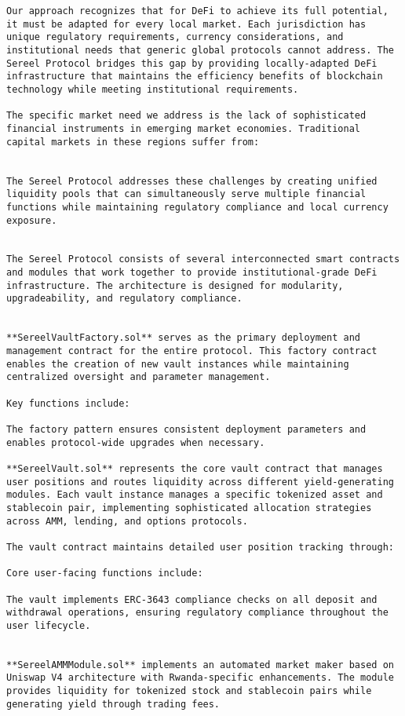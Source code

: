 \documentclass[12pt]{article}
\begin{document}
{{{\begin{itemize}
\begin{lstlisting}
Our approach recognizes that for DeFi to achieve its full potential, it must be adapted for every local market. Each jurisdiction has unique regulatory requirements, currency considerations, and institutional needs that generic global protocols cannot address. The Sereel Protocol bridges this gap by providing locally-adapted DeFi infrastructure that maintains the efficiency benefits of blockchain technology while meeting institutional requirements.

The specific market need we address is the lack of sophisticated financial instruments in emerging market economies. Traditional capital markets in these regions suffer from:


The Sereel Protocol addresses these challenges by creating unified liquidity pools that can simultaneously serve multiple financial functions while maintaining regulatory compliance and local currency exposure.


The Sereel Protocol consists of several interconnected smart contracts and modules that work together to provide institutional-grade DeFi infrastructure. The architecture is designed for modularity, upgradeability, and regulatory compliance.


**SereelVaultFactory.sol** serves as the primary deployment and management contract for the entire protocol. This factory contract enables the creation of new vault instances while maintaining centralized oversight and parameter management.

Key functions include:

The factory pattern ensures consistent deployment parameters and enables protocol-wide upgrades when necessary.

**SereelVault.sol** represents the core vault contract that manages user positions and routes liquidity across different yield-generating modules. Each vault instance manages a specific tokenized asset and stablecoin pair, implementing sophisticated allocation strategies across AMM, lending, and options protocols.

The vault contract maintains detailed user position tracking through:

Core user-facing functions include:

The vault implements ERC-3643 compliance checks on all deposit and withdrawal operations, ensuring regulatory compliance throughout the user lifecycle.


**SereelAMMModule.sol** implements an automated market maker based on Uniswap V4 architecture with Rwanda-specific enhancements. The module provides liquidity for tokenized stock and stablecoin pairs while generating yield through trading fees.


\end{lstlisting}
\end{itemize}}}}
\end{document}
